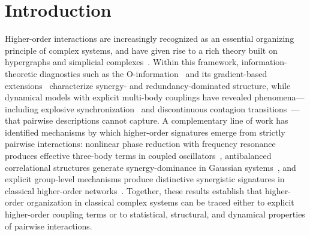 \documentclass[aps,physrev,preprint,groupedaddress]{revtex4-2}
\begin{document}
\section{Introduction}

Higher-order interactions are increasingly recognized as an essential organizing principle of complex systems, and have given rise to a rich theory built on hypergraphs and simplicial complexes~\cite{battiston2021PhysicsHigherorder}. Within this framework, information-theoretic diagnostics such as the O-information~\cite{rosas2019Oinfo} and its gradient-based extensions~\cite{scagliarini2023GradientsOinformation} characterize synergy- and redundancy-dominated structure, while dynamical models with explicit multi-body couplings have revealed phenomena---including explosive synchronization~\cite{millan2020ExplosiveHigherOrder} and discontinuous contagion transitions~\cite{iacopini2019SimplicialModels}---that pairwise descriptions cannot capture. A complementary line of work has identified mechanisms by which higher-order signatures emerge from strictly pairwise interactions: nonlinear phase reduction with frequency resonance produces effective three-body terms in coupled oscillators~\cite{nijholt2022EmergentHypernetworks}, antibalanced correlational structures generate synergy-dominance in Gaussian systems~\cite{caprioglio2026SynergisticMotifs}, and explicit group-level mechanisms produce distinctive synergistic signatures in classical higher-order networks~\cite{robiglio2025SynergisticSignatures}. Together, these results establish that higher-order organization in classical complex systems can be traced either to explicit higher-order coupling terms or to statistical, structural, and dynamical properties of pairwise interactions.
\end{document}
